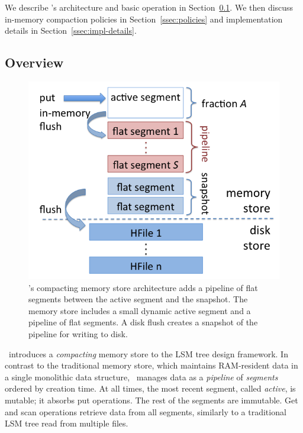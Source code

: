 
We describe  \sys's architecture and basic operation in Section~\ref{ssec:overview}.
We then discuss in-memory compaction policies  in  Section~\ref{ssec:policies}
and implementation details in Section~\ref{ssec:impl-details}. 

\subsection{Overview} \label{ssec:overview}

\begin{figure}[tbh]
\center
\includegraphics[width=\columnwidth]{Accordion} 
\caption{\sys's compacting memory store architecture adds a pipeline of flat segments between the active segment and the snapshot. 
The memory store includes a small dynamic active segment 
and a pipeline of flat segments. A disk flush creates a snapshot of the pipeline for writing to disk.}
\label{fig:accordion}
\end{figure}

\sys\ introduces a \emph{compacting} memory store to the LSM tree design framework. In contrast to the traditional memory store, 
which maintains RAM-resident data in a single monolithic data structure, \sys\ manages data as a \emph{pipeline} of 
\emph{segments} ordered by creation time. At all times, the most recent segment, called \emph{active}, is mutable;
it absorbs  put operations. The rest of the segments are immutable. Get and scan operations retrieve data from all  segments, 
 similarly to a traditional LSM tree read from multiple files. 
 
